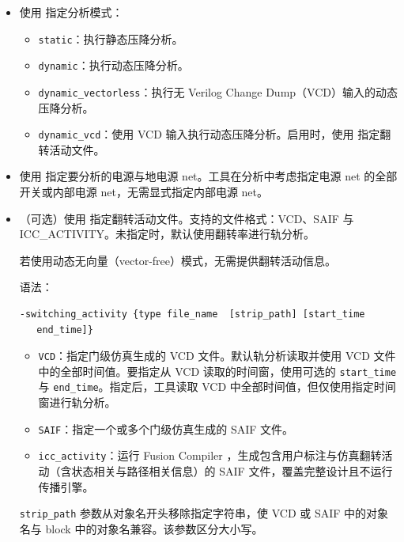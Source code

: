 \begin{itemize}
  \item 使用  指定分析模式：
    \begin{itemize}
      \item \texttt{static}：执行静态压降分析。
      \item \texttt{dynamic}：执行动态压降分析。
      \item \texttt{dynamic\_vectorless}：执行无 Verilog Change Dump（VCD）输入的动态压降分析。
      \item \texttt{dynamic\_vcd}：使用 VCD 输入执行动态压降分析。启用时，使用  指定翻转活动文件。
    \end{itemize}
  \item 使用  指定要分析的电源与地电源 net。工具在分析中考虑指定电源 net 的全部开关或内部电源 net，无需显式指定内部电源 net。
  \item （可选）使用  指定翻转活动文件。支持的文件格式：VCD、SAIF 与 ICC\_ACTIVITY。未指定时，默认使用翻转率进行轨分析。

\begin{noteBox}
若使用动态无向量（vector-free）模式，无需提供翻转活动信息。
\end{noteBox}

语法：
\begin{lstlisting}
-switching_activity {type file_name  [strip_path] [start_time
   end_time]}
\end{lstlisting}
    \begin{itemize}
      \item \texttt{VCD}：指定门级仿真生成的 VCD 文件。默认轨分析读取并使用 VCD 文件中的全部时间值。要指定从 VCD 读取的时间窗，使用可选的 \texttt{start\_time} 与 \texttt{end\_time}。指定后，工具读取 VCD 中全部时间值，但仅使用指定时间窗进行轨分析。
      \item \texttt{SAIF}：指定一个或多个门级仿真生成的 SAIF 文件。
      \item \texttt{icc\_activity}：运行 Fusion Compiler ，生成包含用户标注与仿真翻转活动（含状态相关与路径相关信息）的 SAIF 文件，覆盖完整设计且不运行传播引擎。
    \end{itemize}
    \texttt{strip\_path} 参数从对象名开头移除指定字符串，使 VCD 或 SAIF 中的对象名与 block 中的对象名兼容。该参数区分大小写。


\end{itemize}

